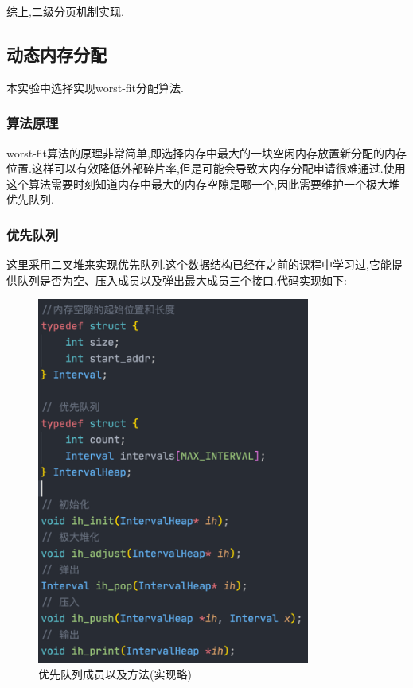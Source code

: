 综上,二级分页机制实现.

\subsection{动态内存分配}

本实验中选择实现worst-fit分配算法.

\subsubsection{算法原理}

worst-fit算法的原理非常简单,即选择内存中最大的一块空闲内存放置新分配的内存位置.这样可以有效降低外部碎片率,但是可能会导致大内存分配申请很难通过.使用这个算法需要时刻知道内存中最大的内存空隙是哪一个,因此需要维护一个极大堆优先队列.

\subsubsection{优先队列}

这里采用二叉堆来实现优先队列.这个数据结构已经在之前的课程中学习过,它能提供队列是否为空、压入成员以及弹出最大成员三个接口.代码实现如下:

\begin{figure}[H]
    \centering
    \includegraphics[width=0.8\textwidth]{figures/heap.png}
    \caption{优先队列成员以及方法(实现略)}
    \label{fig:my_label}
\end{figure}

